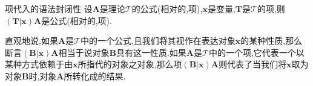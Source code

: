 \begin{metatheorem}{项代入的语法封闭性}{}
	设$\boldsymbol{A}$是理论$\mathcal{T}$的公式(相对的,项),$\boldsymbol{x}$是变量,$\boldsymbol{T}$是$\mathcal{T}$的项,则$\left(\boldsymbol{T}|\boldsymbol{x}\right)\boldsymbol{A}$是公式(相对的,项).
\end{metatheorem}

\begin{remark}{}{}
	直观地说,如果$\boldsymbol{A}$是$\mathcal{T}$中的一个公式,且我们将其视作在表达对象$\boldsymbol{x}$的某种性质,那么断言$\left(\boldsymbol{B}|\boldsymbol{x}\right)\boldsymbol{A}$相当于说对象$\boldsymbol{B}$具有这一性质.如果$\boldsymbol{A}$是$\mathcal{T}$中的一个项,它代表一个以某种方式依赖于由$\boldsymbol{x}$所指代的对象之对象,那么项$\left(\boldsymbol{B}|\boldsymbol{x}\right)\boldsymbol{A}$则代表了当我们将$\boldsymbol{x}$取为对象$\boldsymbol{B}$时,对象$\boldsymbol{A}$所转化成的结果.
\end{remark}






